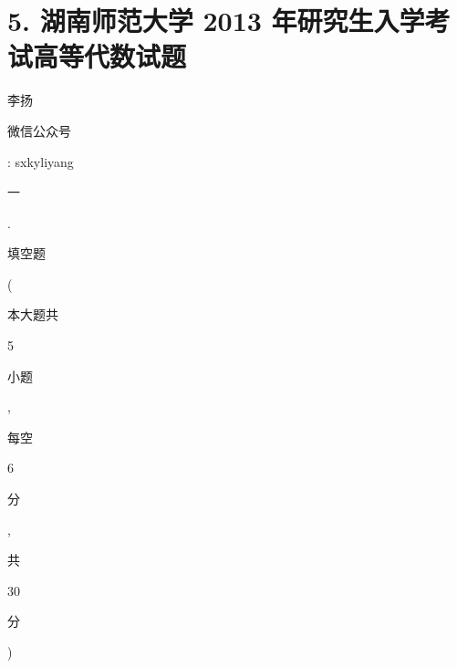 \documentclass[10pt]{article}
\begin{document}
\section{5. 湖南师范大学 2013 年研究生入学考试高等代数试题}
\begin{CJK}{UTF8}{mj}李扬\end{CJK}

\begin{CJK}{UTF8}{mj}微信公众号\end{CJK}: sxkyliyang

\begin{CJK}{UTF8}{mj}一\end{CJK}. \begin{CJK}{UTF8}{mj}填空题\end{CJK} (\begin{CJK}{UTF8}{mj}本大题共\end{CJK} 5 \begin{CJK}{UTF8}{mj}小题\end{CJK}, \begin{CJK}{UTF8}{mj}每空\end{CJK} 6 \begin{CJK}{UTF8}{mj}分\end{CJK}, \begin{CJK}{UTF8}{mj}共\end{CJK} 30 \begin{CJK}{UTF8}{mj}分\end{CJK})
\end{document}
